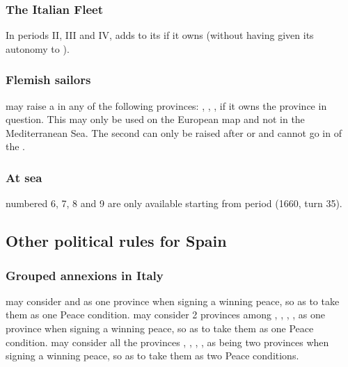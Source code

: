 \subsubsection{The Italian Fleet}\label{chSpecific:Spain:Italian Fleet}
In periods II, III and IV, \SPA adds \FLEET\facemoins to its
 if it owns  (without having
given its autonomy to ).


\subsubsection{Flemish sailors}
\aparag \SPA may raise a \corsaire in any of the following provinces:
, , ,
 if it owns the province in question.
\bparag This \corsaire may only be used on the European map and not in
the Mediterranean Sea.
\aparag The second \corsaire can only be raised after
 or  and cannot go in \STZ of the
.

\subsubsection{At sea}
 \anonyme\LeaderA numbered 6, 7, 8 and 9
are only available starting from period  (1660, turn 35).

\subsection{Other political rules for Spain}


\subsubsection{Grouped annexions in Italy}
\aparag \SPA may consider  and  as
one province when signing a winning peace, so as to take them as one
Peace condition.
\aparag \SPA may consider 2 provinces among ,
, , ,
 as one province when signing a winning peace, so as
to take them as one Peace condition.
\aparag \SPA may consider all the provinces ,
, , ,
 as being two provinces when signing a winning peace,
so as to take them as two Peace conditions.


